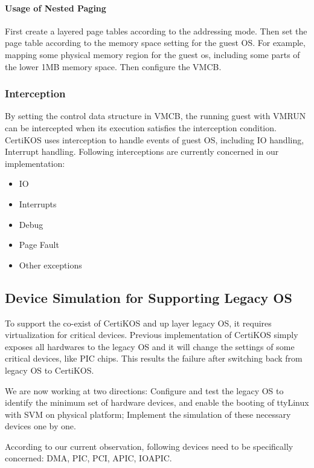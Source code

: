 \documentclass[a4paper,12pt]{article}
\begin{document}
\paragraph{Usage of Nested Paging}

First create a  layered page tables according to the addressing mode.  Then set the page table according to the memory space setting for the guest OS.  For example, mapping some physical memory region for the guest os, including some parts of the lower 1MB memory space.  Then configure the VMCB.

\subsubsection{Interception}
By setting the control data structure in VMCB, the running guest with VMRUN can be intercepted when its execution satisfies the interception condition.  CertiKOS uses interception to handle events of guest OS, including IO handling, Interrupt handling. Following interceptions are currently concerned in our implementation: 
\begin{itemize}
\item IO 
\item Interrupts
\item Debug
\item Page Fault
\item  Other exceptions

\end{itemize}


\subsection{Device Simulation for Supporting Legacy OS }
To support the co-exist of CertiKOS and up layer legacy OS, it requires virtualization for critical devices.  Previous implementation of CertiKOS simply exposes all hardwares to the legacy OS and it will change the settings of some critical devices, like PIC chips. This results the failure after switching back from legacy OS to CertiKOS. 

We are now working at two directions:  Configure and test the legacy OS to identify the minimum  set of hardware devices, and enable the booting of ttyLinux with SVM on physical platform; Implement the simulation of these necessary devices one by one.

According to our current observation, following devices need to be specifically concerned: DMA, PIC, PCI, APIC, IOAPIC.
\end{document}
